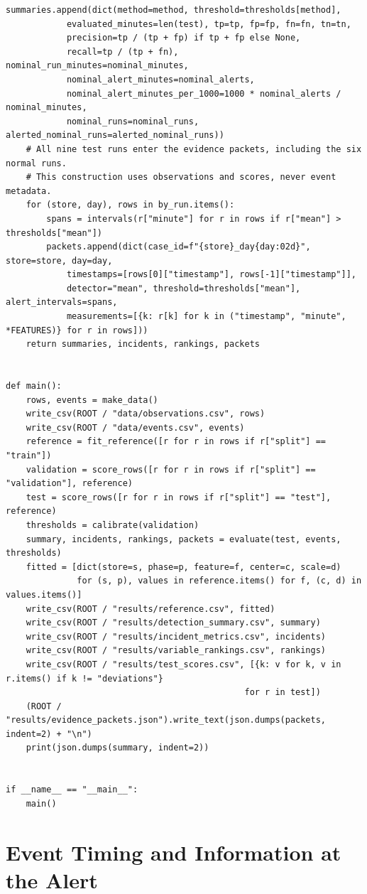 \begin{Verbatim}[breaklines,breakanywhere,fontsize=\small]
        summaries.append(dict(method=method, threshold=thresholds[method],
            evaluated_minutes=len(test), tp=tp, fp=fp, fn=fn, tn=tn,
            precision=tp / (tp + fp) if tp + fp else None,
            recall=tp / (tp + fn), nominal_run_minutes=nominal_minutes,
            nominal_alert_minutes=nominal_alerts,
            nominal_alert_minutes_per_1000=1000 * nominal_alerts / nominal_minutes,
            nominal_runs=nominal_runs, alerted_nominal_runs=alerted_nominal_runs))
    # All nine test runs enter the evidence packets, including the six normal runs.
    # This construction uses observations and scores, never event metadata.
    for (store, day), rows in by_run.items():
        spans = intervals(r["minute"] for r in rows if r["mean"] > thresholds["mean"])
        packets.append(dict(case_id=f"{store}_day{day:02d}", store=store, day=day,
            timestamps=[rows[0]["timestamp"], rows[-1]["timestamp"]],
            detector="mean", threshold=thresholds["mean"], alert_intervals=spans,
            measurements=[{k: r[k] for k in ("timestamp", "minute", *FEATURES)} for r in rows]))
    return summaries, incidents, rankings, packets


def main():
    rows, events = make_data()
    write_csv(ROOT / "data/observations.csv", rows)
    write_csv(ROOT / "data/events.csv", events)
    reference = fit_reference([r for r in rows if r["split"] == "train"])
    validation = score_rows([r for r in rows if r["split"] == "validation"], reference)
    test = score_rows([r for r in rows if r["split"] == "test"], reference)
    thresholds = calibrate(validation)
    summary, incidents, rankings, packets = evaluate(test, events, thresholds)
    fitted = [dict(store=s, phase=p, feature=f, center=c, scale=d)
              for (s, p), values in reference.items() for f, (c, d) in values.items()]
    write_csv(ROOT / "results/reference.csv", fitted)
    write_csv(ROOT / "results/detection_summary.csv", summary)
    write_csv(ROOT / "results/incident_metrics.csv", incidents)
    write_csv(ROOT / "results/variable_rankings.csv", rankings)
    write_csv(ROOT / "results/test_scores.csv", [{k: v for k, v in r.items() if k != "deviations"}
                                               for r in test])
    (ROOT / "results/evidence_packets.json").write_text(json.dumps(packets, indent=2) + "\n")
    print(json.dumps(summary, indent=2))


if __name__ == "__main__":
    main()
\end{Verbatim}

\hypertarget{M07-event-timing-and-information-at-the-alert}{%
\section{Event Timing and Information at the
Alert}\label{M07-event-timing-and-information-at-the-alert}}

